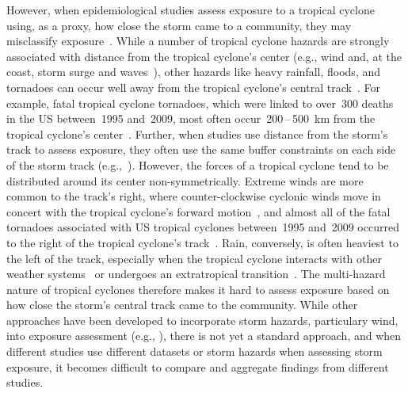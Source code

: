 However, when epidemiological studies assess exposure to a tropical cyclone
using, as a proxy, how close the storm came to a community, they
may misclassify exposure~\parencite{grabich2015measuring}. While a number of
tropical cyclone hazards are strongly associated with distance from the
tropical cyclone's center (e.g., wind and, at the coast, storm surge and
waves~\parencite{rappaport2000, kruk2010}), other hazards like heavy rainfall,
floods, and tornadoes can occur well away from the tropical cyclone's central
track~\parencite{rappaport2000, atallah2007, moore2012}.  For example, fatal
tropical cyclone tornadoes, which were linked to over~300 deaths in the \ac{US}
between~1995 and~2009, most often occur~200\,--\,500~\si{\kilo\metre} from the
tropical cyclone's center~\parencite{moore2012}.  Further, when studies use
distance from the storm's track to assess exposure, they often use the same
buffer constraints on each side of the storm track
(e.g.,~\cite{kinney2008, currie2013}).  However, the forces of a tropical
cyclone tend to be distributed around its center non-symmetrically.  Extreme
winds are more common to the track's right, where counter-clockwise cyclonic
winds move in concert with the tropical cyclone's forward
motion~\parencite{halverson2015}, and almost all of the fatal tornadoes
associated with \ac{US} tropical cyclones between~1995 and~2009 occurred to the
right of the tropical cyclone's track~\parencite{moore2012}. Rain, conversely,
is often heaviest to the left of the track, especially when the tropical
cyclone interacts with other weather systems~\parencite{atallah2003,
atallah2007, zhu2013variations} or undergoes an extratropical
transition~\parencite{elsberry2002}.  The multi-hazard nature of tropical
cyclones therefore makes it hard to assess exposure based on how close the
storm's central track came to the community.  While other approaches have been
developed to incorporate storm hazards, particulary wind, into exposure
assessment (e.g., \cite{grabich2015measuring, zandbergen2009, czajkowski2011}),
there is not yet a standard approach, and when different studies use different
datasets or storm hazards when assessing storm exposure, it becomes difficult
to compare and aggregate findings from different studies. 

